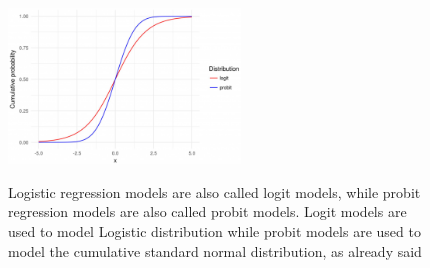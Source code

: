 \begin{enumerate}
        \begin{figure}[h]
          \caption{Logistic regression models are also called logit models,
          while probit regression models are also called probit models. Logit
          models are used to model Logistic distribution while probit models are
          used to model the cumulative standard normal distribution, as already
          said}
          \centering
          \includegraphics[width=0.55\textwidth]{probitLogitDifference}
          \label{fig: probitvslogit}
          \end{figure}


\end{enumerate}
